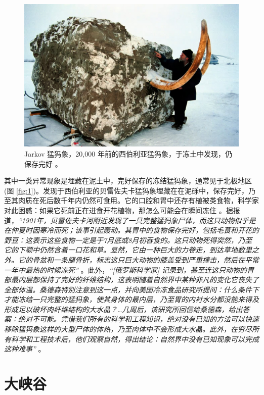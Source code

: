 \documentclass[10pt,twocolumn,letterpaper]{article}
\begin{document}
\begin{figure}[t]
\begin{center}
   \includegraphics[width=1\linewidth]{jarkov-mammoth.jpg}
\end{center}
   \caption{Jarkov 猛犸象，20,000 年前的西伯利亚猛犸象，于冻土中发现，仍保存完好 \cite{51}。}
\label{fig:1}
\label{fig:onecol}
\end{figure}

其中一类异常现象是埋藏在泥土中，完好保存的冻结猛犸象，通常见于北极地区 (图 \ref{fig:1})。发现于西伯利亚的贝雷佐夫卡猛犸象埋藏在在泥砾中，保存完好，乃至其肉质在死后数千年内仍然可食用。它的口腔和胃中还存有植被类食物，科学家对此困惑：如果它死前正在进食开花植物，那怎么可能会在瞬间冻住 \cite{17}。据报道，\textit{“1901年，贝雷佐夫卡河附近发现了一具完整猛犸象尸体，而这只动物似乎是在仲夏时因寒冷而死；该事引起轰动。其胃中的食物保存完好，包括毛茛和开花的野豆：这表示这些食物一定是于7月底或8月初吞食的。这只动物死得突然，乃至它的下颚中仍然含着一口花和草。显然，它由一种巨大的力卷走，到达草地数里之外。它的骨盆和一条腿骨折，标志这只巨大动物的膝盖受到严重撞击，然后在平常一年中最热的时候冻死”} \cite{18}。此外，\textit{“[俄罗斯科学家] 记录到，甚至连这只动物的胃部最内层都保持了完好的纤维结构，这表明随着自然界中某种非凡的变化它丧失了全部体温。桑德森特别注意到这一点，并向美国冷冻食品研究所提问：什么条件下才能冻结一只完整的猛犸象，使其身体的最内层，乃至胃的内衬水分都没能来得及形成足以破坏肉纤维结构的大水晶？…几周后，该研究所回信给桑德森，给出答案：绝对不可能。凭借我们所有的科学和工程知识，绝对没有已知的方法可以快速移除猛犸象这样的大型尸体的体热，乃至肉体中不会形成大水晶。此外，在穷尽所有科学和工程技术后，他们观察自然，得出结论：自然界中没有已知现象可以完成这种难事”} \cite{19}。

\section{大峡谷}
\end{document}
